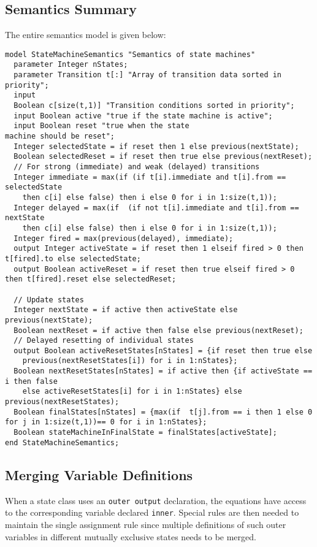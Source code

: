 \subsection{Semantics Summary}\label{semantics-summary}

The entire semantics model is given below:
\begin{lstlisting}[language=modelica]
model StateMachineSemantics "Semantics of state machines"
  parameter Integer nStates;
  parameter Transition t[:] "Array of transition data sorted in priority";
  input
  Boolean c[size(t,1)] "Transition conditions sorted in priority";
  input Boolean active "true if the state machine is active";
  input Boolean reset "true when the state
machine should be reset";
  Integer selectedState = if reset then 1 else previous(nextState);
  Boolean selectedReset = if reset then true else previous(nextReset);
  // For strong (immediate) and weak (delayed) transitions
  Integer immediate = max(if (if t[i].immediate and t[i].from == selectedState
    then c[i] else false) then i else 0 for i in 1:size(t,1));
  Integer delayed = max(if  (if not t[i].immediate and t[i].from == nextState
    then c[i] else false) then i else 0 for i in 1:size(t,1));
  Integer fired = max(previous(delayed), immediate);
  output Integer activeState = if reset then 1 elseif fired > 0 then t[fired].to else selectedState;
  output Boolean activeReset = if reset then true elseif fired > 0 then t[fired].reset else selectedReset;

  // Update states
  Integer nextState = if active then activeState else previous(nextState);
  Boolean nextReset = if active then false else previous(nextReset);
  // Delayed resetting of individual states
  output Boolean activeResetStates[nStates] = {if reset then true else
    previous(nextResetStates[i]) for i in 1:nStates};
  Boolean nextResetStates[nStates] = if active then {if activeState == i then false
    else activeResetStates[i] for i in 1:nStates} else previous(nextResetStates);
  Boolean finalStates[nStates] = {max(if  t[j].from == i then 1 else 0 for j in 1:size(t,1))== 0 for i in 1:nStates};
  Boolean stateMachineInFinalState = finalStates[activeState];
end StateMachineSemantics;
\end{lstlisting}
\subsection{Merging Variable Definitions}\label{merging-variable-definitions}

\begin{nonnormative}
When a state class uses an \lstinline!outer output! declaration,
the equations have access to the corresponding variable declared
\lstinline!inner!. Special rules are then needed to maintain the single
assignment rule since multiple definitions of such outer variables in
different mutually exclusive states needs to be merged.
\end{nonnormative}

